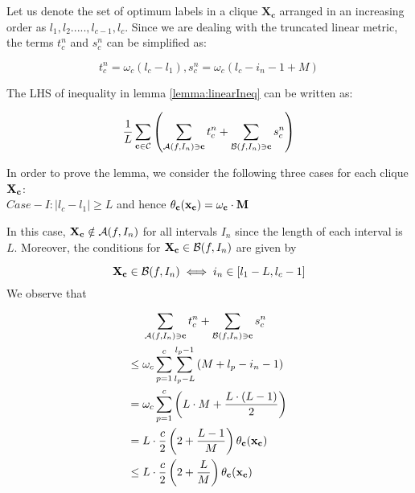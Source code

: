 \documentclass[10pt,letterpaper]{article}
\begin{document}
Let us denote the set of optimum labels in a clique $\mathbf{X_{c}}$ arranged in an increasing order as ${l_1, l_2....., l_{c-1}, l_c}$. Since we are dealing with the truncated linear metric, the terms $t_c^n$ and $s_c^n$ can be simplified as:

\begin{equation}
	t_c^n = \omega_c (l_c - l_1), s_c^n = \omega_c (l_c - i_n - 1 + M)
\end{equation}

The LHS of inequality in lemma \ref{lemma:linearIneq} can be written as:

\begin{equation}
\frac{1}{L}\sum_{{\bf c} \in \mathcal{C}}\left(\sum_{\mathcal{A}\mathit(f, I_n) \ni {\bf c}} t_c^n + \sum_{\mathcal{B}\mathit(f, I_n) \ni {\bf c}} s_c^n \right)
\label{eq:rewriteIneq}
\end{equation}

In order to prove the lemma, we consider the following three cases for each clique ${\bf X_c}$: \\

$Case - I: |l_c - l_1| \geq L$ and hence $\theta_{\bf c}(\bf{x_c}) = \omega_c \cdot M$

In this case, ${\bf X_c} \notin \mathcal{A}\mathit(f, I_n)$ for all intervals $I_n$ since the length of each interval is $L$. Moreover, the conditions for ${\bf X_c} \in \mathcal{B}\mathit(f, I_n)$ are given by

\begin{equation*}
	{\bf X_c} \in \mathcal{B}\mathit(f, I_n) \iff i_n \in [l_1 - L, l_c - 1]
\end{equation*}
We observe that

\begin{align}
	& \sum_{\mathcal{A}\mathit(f, I_n) \ni {\bf c}} t_c^n + \sum_{\mathcal{B}\mathit(f, I_n) \ni {\bf c}} s_c^n \nonumber\\
	\leq{}  & \omega_c \sum_{p = 1}^{c} \sum_{l_p - L}^{l_p - 1} \left( M + l_p - i_n - 1 \right)\nonumber\\        
	={}  & \omega_c \sum_{p=1}^{c} \left(L \cdot M + \frac{L \cdot (L - 1)}{2}\right) \nonumber\\
	={}  & L \cdot \frac{c}{2} \left( 2 + \frac{L - 1}{M} \right) \theta_{\bf c}(\bf{x_c}) \nonumber\\
	\leq{}  & L \cdot \frac{c}{2} \left( 2 + \frac{L}{M} \right) \theta_{\bf c}(\bf{x_c}) \label{eq:case1bound}
\end{align}
	
\end{document}
